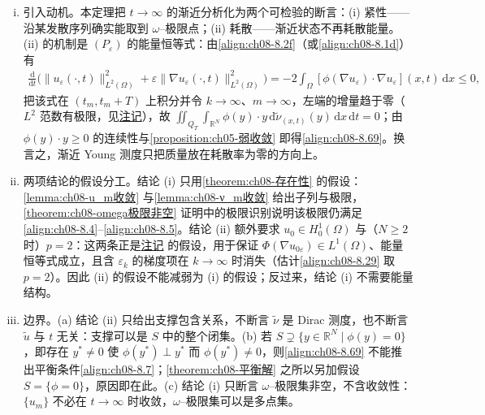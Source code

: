 \documentclass[../../main.tex]{subfiles}%
\begin{document}
\begin{remark}\label{remark:ch08-omega极限非空}
\begin{enumerate}[(i)]
\item 引入动机。本定理把 $t\to\infty$ 的渐近分析化为两个可检验的断言：(i) 紧性——沿某发散序列确实能取到 $\omega$--极限点；(ii) 耗散——渐近状态不再耗散能量。(ii) 的机制是 $(P_\varepsilon)$ 的能量恒等式：由\eqref{align:ch08-8.2f}（或\eqref{align:ch08-8.1d}）有
\begin{align*}
\frac{\mathrm{d}}{\mathrm{d}t}\Big(\|u_\varepsilon(\cdot,t)\|^2_{L^2(\Omega)}+\varepsilon\|\nabla u_\varepsilon(\cdot,t)\|^2_{L^2(\Omega)}\Big)
=-2\int_\Omega[\phi(\nabla u_\varepsilon)\cdot\nabla u_\varepsilon](x,t)\,\mathrm{d}x\leqslant0,
\end{align*}
把该式在 $(t_m,t_m+T)$ 上积分并令 $k\to\infty$、$m\to\infty$，左端的增量趋于零（$L^2$ 范数有极限，见\hyperref[remark:ch08-能量衰减]{注记}），故 $\iint_{Q_T}\int_{\mathbb{R}^N}\phi(y)\cdot y\,\mathrm{d}\tilde\nu_{(x,t)}(y)\,\mathrm{d}x\,\mathrm{d}t=0$；由 $\phi(y)\cdot y\geqslant0$ 的连续性与\cref{proposition:ch05-弱收敛} 即得\eqref{align:ch08-8.69}。换言之，渐近 Young 测度只把质量放在耗散率为零的方向上。
\item 两项结论的假设分工。结论 (i) 只用\cref{theorem:ch08-存在性} 的假设：\cref{lemma:ch08-u_m收敛} 与\cref{lemma:ch08-ν_m收敛} 给出子列与极限，\cref{theorem:ch08-omega极限非空} 证明中的极限识别说明该极限仍满足\eqref{align:ch08-8.4}--\eqref{align:ch08-8.5}。结论 (ii) 额外要求 $u_0\in H^1_0(\Omega)$ 与（$N\geqslant2$ 时）$p=2$：这两条正是\hyperref[remark:ch08-能量衰减]{注记} 的假设，用于保证 $\Phi(\nabla u_{0\varepsilon})\in L^1(\Omega)$、能量恒等式成立，且含 $\varepsilon_k$ 的梯度项在 $k\to\infty$ 时消失（估计\eqref{align:ch08-8.29} 取 $p=2$）。因此 (ii) 的假设不能减弱为 (i) 的假设；反过来，结论 (i) 不需要能量结构。
\item 边界。(a) 结论 (ii) 只给出支撑包含关系，不断言 $\tilde\nu$ 是 Dirac 测度，也不断言 $\tilde u$ 与 $t$ 无关：支撑可以是 $S$ 中的整个闭集。(b) 若 $S\supsetneq\{y\in\mathbb{R}^N\mid\phi(y)=0\}$，即存在 $y^*\neq0$ 使 $\phi(y^*)\perp y^*$ 而 $\phi(y^*)\neq0$，则\eqref{align:ch08-8.69} 不能推出平衡条件\eqref{align:ch08-8.7}；\cref{theorem:ch08-平衡解} 之所以另加假设 $S=\{\phi=0\}$，原因即在此。(c) 结论 (i) 只断言 $\omega$--极限集非空，不含收敛性：$\{u_m\}$ 不必在 $t\to\infty$ 时收敛，$\omega$--极限集可以是多点集。
\end{enumerate}
\end{remark}
\end{document}
